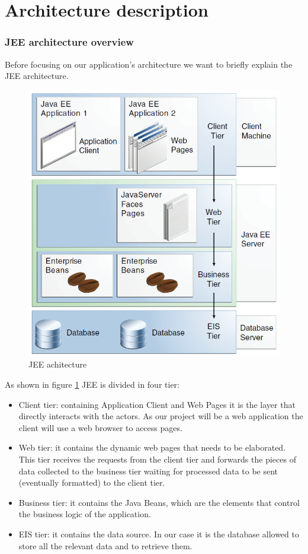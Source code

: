 \documentclass[10pt,a4paper,titlepage]{article}
\begin{document}


\part{Architecture description}
\section{JEE architecture overview}
Before focusing on our application's architecture we want to briefly explain the JEE architecture.

\begin{figure}[h]
\centering
\includegraphics[width=\linewidth]{./images/JEE-arch}
\caption[JEE architecture]{JEE achitecture}
\label{fig:JEE-arch}
\end{figure}

As shown in figure \ref{fig:JEE-arch} JEE is divided in four tier:
\begin{itemize}
\item Client tier: containing Application Client and Web Pages it is the layer that directly interacts with the actors. As our project will be a web application the client will use a web browser to access pages.
\item Web tier: it contains the dynamic web pages that needs to be elaborated. This tier receives the requests from the client tier and forwards the pieces of data collected to the business tier waiting for processed data to be sent (eventually formatted) to the client tier.
\item Business tier: it contains the Java Beans, which are the elements that control the business logic of the application.
\item EIS tier: it contains the data source. In our case it is the database allowed to store all the relevant data and to retrieve them.
\end{itemize}
\end{document}
